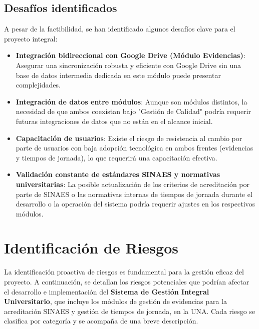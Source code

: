 \subsection{Desafíos identificados}
A pesar de la factibilidad, se han identificado algunos desafíos clave para el proyecto integral:
\begin{itemize}
    \item \textbf{Integración bidireccional con Google Drive (Módulo Evidencias)}: Asegurar una sincronización robusta y eficiente con Google Drive sin una base de datos intermedia dedicada en este módulo puede presentar complejidades.
    \item \textbf{Integración de datos entre módulos}: Aunque son módulos distintos, la necesidad de que ambos coexistan bajo "Gestión de Calidad" podría requerir futuras integraciones de datos que no están en el alcance inicial.
    \item \textbf{Capacitación de usuarios}: Existe el riesgo de resistencia al cambio por parte de usuarios con baja adopción tecnológica en ambos frentes (evidencias y tiempos de jornada), lo que requerirá una capacitación efectiva.
    \item \textbf{Validación constante de estándares SINAES y normativas universitarias}: La posible actualización de los criterios de acreditación por parte de SINAES o las normativas internas de tiempos de jornada durante el desarrollo o la operación del sistema podría requerir ajustes en los respectivos módulos.
\end{itemize}

\newpage
\section{Identificación de Riesgos}
La identificación proactiva de riesgos es fundamental para la gestión eficaz del proyecto. A continuación, se detallan los riesgos potenciales que podrían afectar el desarrollo e implementación del \textbf{Sistema de Gestión Integral Universitario}, que incluye los módulos de gestión de evidencias para la acreditación SINAES y gestión de tiempos de jornada, en la UNA. Cada riesgo se clasifica por categoría y se acompaña de una breve descripción.


